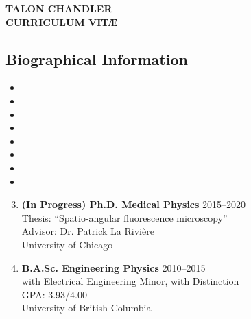 \documentclass[12pt,letterpaper]{article}
\newenvironment{benumerate}[1]{
    \let\oldItem\item
    \def\item{\addtocounter{enumi}{-2}\oldItem}
    \begin{enumerate}[labelsep=0.0125\textwidth, align=left]
    \setcounter{enumi}{#1}
    \addtocounter{enumi}{1}
}{
    \end{enumerate}
}
\begin{document}
\begin{center}
{\Large \textbf{TALON CHANDLER}}\\
{\textbf{CURRICULUM VIT\AE}}\\
\end{center}
\vspace{-1em}

\subsection*{Biographical Information}
\begin{itemize}[noitemsep]
\item[]  
\item[]  
\item[]  
\item[] \itab{} 
\item[] \itab{} 
\item[]  
\item[]  
\item[]  
\end{itemize}

\begin{benumerate}{2}
\item
  \textbf{(In Progress) Ph.D. Medical Physics} \hfill 2015--2020\\
  Thesis: ``Spatio-angular fluorescence microscopy''\\
  Advisor: Dr. Patrick La Rivi\`ere \\
  University of Chicago
\item
  \textbf{B.A.Sc. Engineering Physics} \hfill 2010--2015\\
  with Electrical Engineering Minor, with Distinction\\
  GPA: 3.93/4.00\\
  University of British Columbia
\end{benumerate}

\nocite{*}
\setlength{}
\printbibliography[heading=none, type=article, sorting=ynt]
\end{document}
